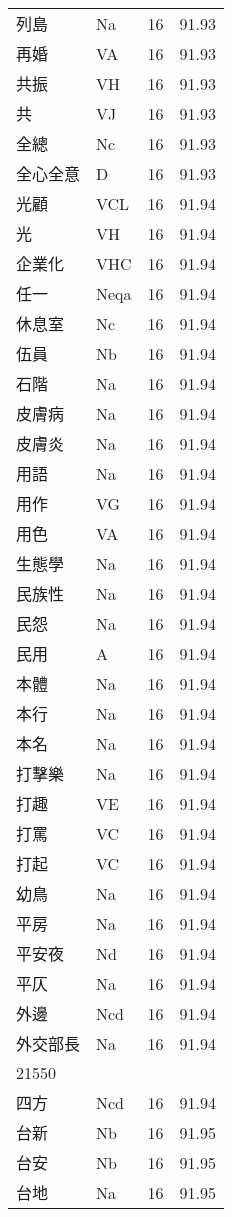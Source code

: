\documentclass[twocolumn]{book}
\begin{document}
\begin{supertabular}{llrr}
列島 & Na & 16 &  91.93\\
再婚 & VA & 16 &  91.93\\
共振 & VH & 16 &  91.93\\
共 & VJ & 16 &  91.93\\
全總 & Nc & 16 &  91.93\\
全心全意 & D & 16 &  91.93\\
光顧 & VCL & 16 &  91.94\\
光 & VH & 16 &  91.94\\
企業化 & VHC & 16 &  91.94\\
任一 & Neqa & 16 &  91.94\\
休息室 & Nc & 16 &  91.94\\
伍員 & Nb & 16 &  91.94\\
石階 & Na & 16 &  91.94\\
皮膚病 & Na & 16 &  91.94\\
皮膚炎 & Na & 16 &  91.94\\
用語 & Na & 16 &  91.94\\
用作 & VG & 16 &  91.94\\
用色 & VA & 16 &  91.94\\
生態學 & Na & 16 &  91.94\\
民族性 & Na & 16 &  91.94\\
民怨 & Na & 16 &  91.94\\
民用 & A & 16 &  91.94\\
本體 & Na & 16 &  91.94\\
本行 & Na & 16 &  91.94\\
本名 & Na & 16 &  91.94\\
打擊樂 & Na & 16 &  91.94\\
打趣 & VE & 16 &  91.94\\
打罵 & VC & 16 &  91.94\\
打起 & VC & 16 &  91.94\\
幼鳥 & Na & 16 &  91.94\\
平房 & Na & 16 &  91.94\\
平安夜 & Nd & 16 &  91.94\\
平仄 & Na & 16 &  91.94\\
外邊 & Ncd & 16 &  91.94\\
外交部長 & Na & 16 &  91.94\\
21550\\
四方 & Ncd & 16 &  91.94\\
台新 & Nb & 16 &  91.95\\
台安 & Nb & 16 &  91.95\\
台地 & Na & 16 &  91.95\\

\end{supertabular}
\end{document}
